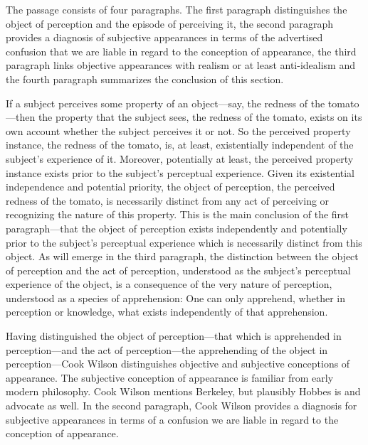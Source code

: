 \documentclass[12pt]{article}
\begin{document}
The passage consists of four paragraphs. The first paragraph distinguishes the object of perception and the episode of perceiving it, the second paragraph provides a diagnosis of subjective appearances in terms of the advertised confusion that we are liable in regard to the conception of appearance, the third paragraph links objective appearances with realism or at least anti-idealism and the fourth paragraph summarizes the conclusion of this section.

If a subject perceives some property of an object---say, the redness of the tomato---then the property that the subject sees, the redness of the tomato, exists on its own account whether the subject perceives it or not. So the perceived property instance, the redness of the tomato, is, at least, existentially independent of the subject's experience of it. Moreover, potentially at least, the perceived property instance exists prior to the subject's perceptual experience. Given its existential independence and potential priority, the object of perception, the perceived redness of the tomato, is necessarily distinct from any act of perceiving or recognizing the nature of this property. This is the main conclusion of the first paragraph---that the object of perception exists independently and potentially prior to the subject's perceptual experience which is necessarily distinct from this object. As will emerge in the third paragraph, the distinction between the object of perception and the act of perception, understood as the subject's perceptual experience of the object, is a consequence of the very nature of perception, understood as a species of apprehension: One can only apprehend, whether in perception or knowledge, what exists independently of that apprehension.

Having distinguished the object of perception---that which is apprehended in perception---and the act of per\-cep\-tion\----the apprehending of the object in per\-cep\-tion\----Cook Wilson distinguishes objective and subjective conceptions of appearance. The subjective conception of appearance is familiar from early modern philosophy. Cook Wilson mentions Berkeley, but plausibly Hobbes is and advocate as well. In the second paragraph, Cook Wilson provides a diagnosis for subjective appearances in terms of a confusion we are liable in regard to the conception of appearance. 
\end{document}
